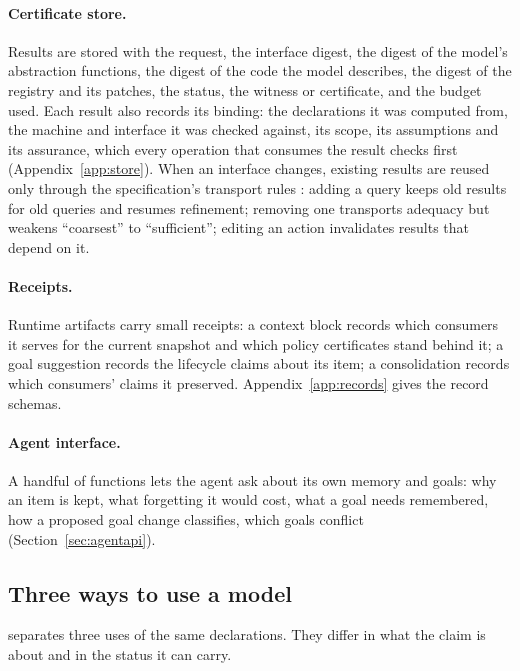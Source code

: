 \documentclass[11pt]{article}
\theoremstyle{definition}
\theoremstyle{plain}
\begin{document}
\paragraph{Certificate store.} Results are stored with the request, the interface digest, the
digest of the model's abstraction functions, the digest of the code the model describes, the
digest of the registry and its patches, the status, the witness or certificate, and the budget
used. Each result also records its binding: the declarations it was computed from, the machine and
interface it was checked against, its scope, its assumptions and its assurance, which every
operation that consumes the result checks first (Appendix~\ref{app:store}). When an interface
changes, existing
results are reused only through the specification's transport rules \cite[Section~4.8]{spec}:
adding a query keeps old results for old queries and resumes refinement; removing one transports
adequacy but weakens ``coarsest'' to ``sufficient''; editing an action invalidates results that
depend on it.

\paragraph{Receipts.} Runtime artifacts carry small receipts: a context block records which
consumers it serves for the current snapshot and which policy certificates stand behind it; a goal
suggestion records the lifecycle claims about its item; a consolidation records which consumers'
claims it preserved. Appendix~\ref{app:records} gives the record schemas.

\paragraph{Agent interface.} A handful of functions lets the agent ask about its own memory and
goals: why an item is kept, what forgetting it would cost, what a goal needs remembered, how a
proposed goal change classifies, which goals conflict (Section~\ref{sec:agentapi}).

\subsection{Three ways to use a model}\label{sec:uses}

 separates three uses of the same declarations. They differ in what the claim is
about and in the status it can carry.
\end{document}
